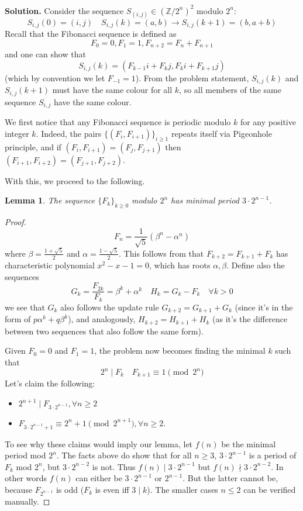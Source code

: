 \documentclass[11pt]{article}
\newcommand{\bbZ}{\mathbb Z}
\newcommand{\<}{\langle}
\renewcommand{\>}{\rangle}
\newtheorem{lemma}{Lemma}
\begin{document}
\begin{enumerate}
	\textbf{Solution.} Consider the sequence $S_{(i, j)}\in (\bbZ/2^n)^2$ modulo $2^n$: 
	\[
	S_{i, j}(0)=(i, j)\quad S_{i, j}(k) = (a, b)\to S_{i, j}(k+1)=(b, a+b) 
	\]
	Recall that the Fibonacci sequence is defined as
	\[
	F_0=0, F_1=1, F_{n+2}=F_n+F_{n+1}
	\]
	and one can show that 
	\[
	S_{i, j}(k)=(F_{k-1}i+F_{k}j, F_{k}i+F_{k+1}j)
	\]
	(which by convention we let $F_{-1}=1$). 
	From the problem statement, $S_{i, j}(k)$ and $S_{i, j}(k+1)$ must have the same colour for all $k$, 
	so all members of the same sequence $S_{i, j}$ have the same colour. 
	
	We first notice that any Fibonacci sequence is periodic modulo $k$ for any positive integer $k$. Indeed, the pairs $\{(F_i, F_{i+1})\}_{i\ge 1}$ repeats itself via Pigeonhole principle, and if $(F_i, F_{i+1})=(F_j, F_{j+1})$ then $(F_{i+1}, F_{i+2})=(F_{j+1}, F_{j+2})$. 
	
	With this, we proceed to the following. 
	\begin{lemma}
		The sequence $\{F_k\}_{k\ge 0}$ modulo $2^n$ has minimal period $3\cdot 2^{n-1}$. 
	\end{lemma}
	
	\begin{proof}
		\[
		F_n=\frac{1}{\sqrt{5}}(\beta^n-\alpha^n)
		\]
		where $\beta=\frac{1+\sqrt{5}}{2}$ and $\alpha=\frac{1-\sqrt{5}}{2}$. 
		This follows from that $F_{k+2}=F_{k+1}+F_k$ has characteristic polynomial $x^2-x-1=0$, which has roots $\alpha, \beta$. 
		Define also the sequences
		\[
		G_k = \frac{F_{2k}}{F_k}=\beta^k+\alpha^k \quad H_k = G_k-F_k\quad \forall k>0
		\]
		we see that $G_k$ also follows the update rule $G_{k+2}=G_{k+1}+G_k$ 
		(since it's in the form of $p\alpha^k+q\beta^k$), 
		and analogously, $H_{k+2}=H_{k+1}+H_k$ (as it's the difference between two sequences that also follow the same form). 
		
		Given $F_0=0$ and $F_1=1$, the problem now becomes finding the minimal $k$ such that 
		\[
		2^n\mid F_k\quad F_{k+1}\equiv 1\pmod{2^n}
		\]
		Let's claim the following: 
		\begin{itemize}
			\item $2^{n+1}\mid F_{3\cdot 2^{n-1}}, \forall n\ge 2$
			\item $F_{3\cdot 2^{n-1}+1}\equiv 2^n+1\pmod{2^{n+1}}, \forall n\ge 2$.  
		\end{itemize}
		To see why these claims would imply our lemma, let $f(n)$ be the minimal period mod $2^n$. 
		The facts above do show that for all $n\ge 3$, $3\cdot 2^{n-1}$ is a period of $F_k$ mod $2^n$, but $3\cdot 2^{n-2}$ is not. 
		Thus $f(n)\mid 3\cdot 2^{n-1}$ but $f(n)\nmid 3\cdot 2^{n-2}$. In other words $f(n)$ can either be $3\cdot 2^{n-1}$ or $2^{n-1}$. But the latter cannot be, because $F_{2^{n-1}}$ is odd ($F_k$ is even iff $3\mid k$). 
		The smaller cases $n\le 2$ can be verified manually. 
		

\end{proof}
\end{enumerate}
\end{document}
